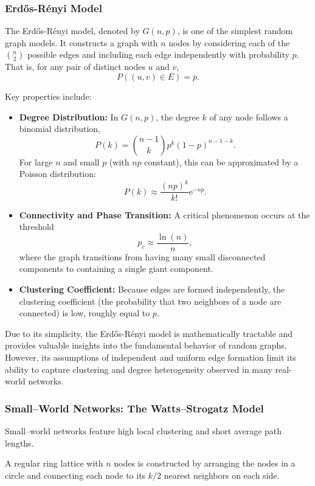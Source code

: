 \documentclass[10pt, headings=standardclasses, parskip=half, twoside]{scrartcl}
\begin{document}
\subsubsection{Erdős-Rényi Model}\label{subsubsec:ER}
\begin{definition}\label{def:ER}
The Erdős-Rényi model, denoted by \(G(n,p)\), is one of the simplest random graph models. 
It constructs a graph with \(n\) nodes by considering each of the \(\binom{n}{2}\) possible edges and including each edge independently with probability \(p\). 
That is, for any pair of distinct nodes \(u\) and \(v\),
\[
P((u,v)\in E)=p.
\]
\end{definition}
Key properties include:
\begin{itemize}
  \item \textbf{Degree Distribution:} In \(G(n,p)\), the degree \(k\) of any node follows a binomial distribution,
  \[
  P(k)=\binom{n-1}{k} p^k (1-p)^{n-1-k}.
  \]
  For large \(n\) and small \(p\) (with \(np\) constant), this can be approximated by a Poisson distribution:
  \[
  P(k)\approx \frac{(np)^k}{k!} \mathrm{e}^{-np}.
  \]
  \item \textbf{Connectivity and Phase Transition:}
  A critical phenomenon occurs at the threshold
  \[
  p_c\approx \frac{\ln(n)}{n},
  \]
  where the graph transitions from having many small disconnected components to containing a single giant component.
  \item \textbf{Clustering Coefficient:} 
  Because edges are formed independently, the clustering coefficient (the probability that two neighbors of a node are connected) is low, roughly equal to \(p\).
\end{itemize}

Due to its simplicity, the Erdős-Rényi model is mathematically tractable and provides valuable insights into the fundamental behavior of random graphs.
However, its assumptions of independent and uniform edge formation limit its ability to capture clustering and degree heterogeneity observed in many real-world networks.

\subsubsection{Small–World Networks: The Watts–Strogatz Model}\label{subsubsec:WS}
Small–world networks feature high local clustering and short average path lengths.

\begin{definition}\label{def:ringlattice}
A regular ring lattice with \(n\) nodes is constructed by arranging the nodes in a circle and connecting each node to its \(k/2\) nearest neighbors on each side.
\end{definition}
\end{document}
